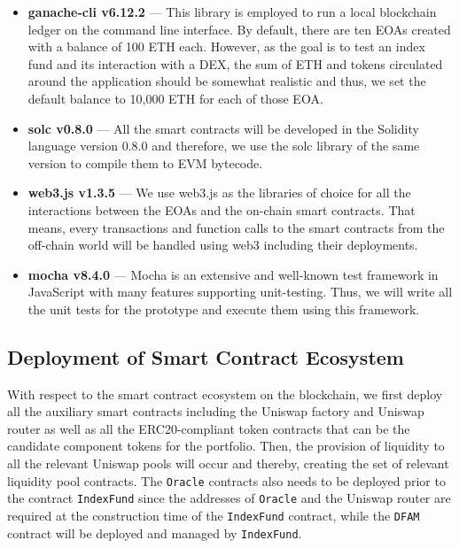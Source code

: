 \begin{itemize}
    \item \textbf{ganache-cli v6.12.2} --- This library is employed to run a local blockchain ledger on the command line interface. By default, there are ten EOAs created with a balance of 100 ETH each. However, as the goal is to test an index fund and its interaction with a DEX, the sum of ETH and tokens circulated around the application should be somewhat realistic and thus, we set the default balance to 10,000 ETH for each of those EOA.
    
    \item \textbf{solc v0.8.0} --- All the smart contracts will be developed in the Solidity language version 0.8.0 and therefore, we use the solc library of the same version to compile  them to EVM bytecode.
    
    \item \textbf{web3.js v1.3.5} --- We use web3.js as the libraries of choice for all the interactions between the EOAs and the on-chain smart contracts. That means, every transactions and function calls to the smart contracts from the off-chain world will be handled using web3 including their deployments.
    
    \item \textbf{mocha v8.4.0} --- Mocha is an extensive and well-known test framework in JavaScript with many features supporting unit-testing. Thus, we will write all the unit tests for the prototype and execute them using this framework.
    
\end{itemize}

\subsection{Deployment of Smart Contract Ecosystem}

With respect to the smart contract ecosystem on the blockchain, we first deploy all the auxiliary smart contracts including the Uniswap factory and Uniswap router as well as all the ERC20-compliant token contracts that can be the candidate component tokens for the portfolio. Then, the provision of liquidity to all the relevant Uniswap pools will occur and thereby, creating the set of relevant liquidity pool contracts. The \texttt{Oracle} contracts also needs to be deployed prior to the contract \texttt{IndexFund} since the addresses of \texttt{Oracle} and the Uniswap router are required at the construction time of the \texttt{IndexFund} contract, while the \texttt{DFAM} contract will be deployed and managed by \texttt{IndexFund}.

